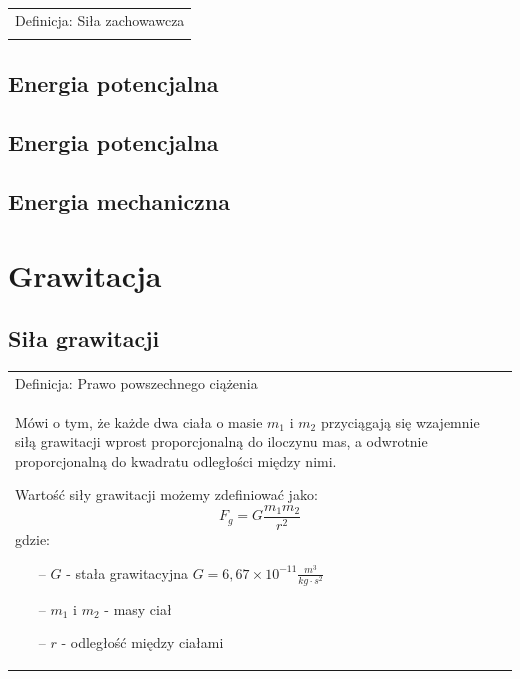 \documentclass[a4paper]{article}
\newenvironment{definition}[2][Definicja]
    {
        \begin{center}
        \begin{tabular}{|p{1\textwidth}|}
        \hline
            #1: #2\\[2ex]
        \begin{em}
        \Large
    }
    { 
        \end{em}
        \\\hline
        \end{tabular} 
        \end{center}
    }
\begin{document}
    \begin{definition}{Siła zachowawcza}
        
    \end{definition}

    \subsection{\LARGE Energia potencjalna}

    \subsection{\LARGE Energia potencjalna}

    \subsection{\LARGE Energia mechaniczna}

    \pagebreak
    \section{\huge Grawitacja}
    \subsection{\LARGE Siła grawitacji}
    \begin{definition}{Prawo powszechnego ciążenia}
        Mówi o tym, że każde dwa ciała o masie $m_1$ i $m_2$ przyciągają się wzajemnie siłą grawitacji 
        wprost proporcjonalną do iloczynu mas, a odwrotnie proporcjonalną do kwadratu odległości między nimi.

        Wartość siły grawitacji możemy zdefiniować jako:
        \[F_g = G\frac{m_1m_2}{r^2}\]
        gdzie:
        \begin{itemize}
            \item[--] $G$ - stała grawitacyjna $G = 6,67\times 10^{-11} \frac{m^3}{kg \cdot s^2}$
            \item[--] $m_1$ i $m_2$ - masy ciał
            \item[--] $r$ - odległość między ciałami  
        \end{itemize}
    \end{definition}
\end{document}
